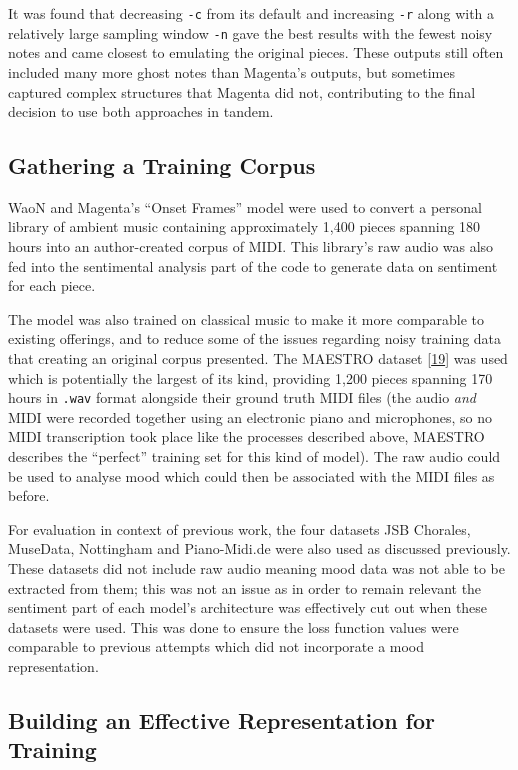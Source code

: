 \documentclass[12pt,]{article}
\begin{document}
It was found that decreasing \texttt{-c} from its default and increasing
\texttt{-r} along with a relatively large sampling window \texttt{-n}
gave the best results with the fewest noisy notes and came closest to
emulating the original pieces. These outputs still often included many
more ghost notes than Magenta's outputs, but sometimes captured complex
structures that Magenta did not, contributing to the final decision to
use both approaches in tandem.

\hypertarget{gathering-a-training-corpus}{%
\subsection{Gathering a Training
Corpus}\label{gathering-a-training-corpus}}

WaoN and Magenta's ``Onset Frames'' model were used to convert a
personal library of ambient music containing approximately 1,400 pieces
spanning 180 hours into an author-created corpus of MIDI. This library's
raw audio was also fed into the sentimental analysis part of the code to
generate data on sentiment for each piece.

The model was also trained on classical music to make it more comparable
to existing offerings, and to reduce some of the issues regarding noisy
training data that creating an original corpus presented. The MAESTRO
dataset {[}\protect\hyperlink{ref-maestro2018}{19}{]} was used which is
potentially the largest of its kind, providing 1,200 pieces spanning 170
hours in \texttt{.wav} format alongside their ground truth MIDI files
(the audio \emph{and} MIDI were recorded together using an electronic
piano and microphones, so no MIDI transcription took place like the
processes described above, MAESTRO describes the ``perfect'' training
set for this kind of model). The raw audio could be used to analyse mood
which could then be associated with the MIDI files as before.

For evaluation in context of previous work, the four datasets JSB
Chorales, MuseData, Nottingham and Piano-Midi.de were also used as
discussed previously. These datasets did not include raw audio meaning
mood data was not able to be extracted from them; this was not an issue
as in order to remain relevant the sentiment part of each model's
architecture was effectively cut out when these datasets were used. This
was done to ensure the loss function values were comparable to previous
attempts which did not incorporate a mood representation.

\hypertarget{building-an-effective-representation-for-training}{%
\subsection{Building an Effective Representation for
Training}\label{building-an-effective-representation-for-training}}
\end{document}
